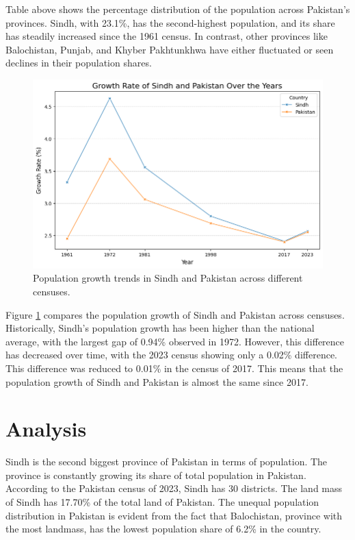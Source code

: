 \documentclass{article}
\begin{document}
\noindent Table above shows the percentage distribution of the population across Pakistan's provinces. Sindh, with 23.1\%, has the second-highest population, and its share has steadily increased since the 1961 census. In contrast, other provinces like Balochistan, Punjab, and Khyber Pakhtunkhwa have either fluctuated or seen declines in their population shares.

\begin{figure}[H]
    \centering
    \includegraphics[width=\textwidth]{../Figures/Figure02.png}
    \caption{Population growth trends in Sindh and Pakistan across different censuses.}
    \label{fig:fig2}
\end{figure}

\noindent Figure \ref{fig:fig2} compares the population growth of Sindh and Pakistan across censuses. Historically, Sindh's population growth has been higher than the national average, with the largest gap of 0.94\% observed in 1972. However, this difference has decreased over time, with the 2023 census showing only a 0.02\% difference. This difference was reduced to 0.01\% in the census of 2017. This means that the population growth of Sindh and Pakistan is almost the same since 2017. 

\section*{Analysis}
\noindent Sindh is the second biggest province of Pakistan in terms of population. The province is constantly growing its share of total population in Pakistan. According to the Pakistan census of 2023, Sindh has 30 districts. The land mass of Sindh has 17.70\% of the total land of Pakistan. The unequal population distribution in Pakistan is evident from the fact that Balochistan, province with the most landmass, has the lowest population share of 6.2\% in the country. 
\end{document}
